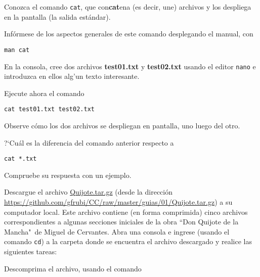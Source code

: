 \documentclass[11pt]{exam}
\begin{document}
\begin{questions}

\item Conozca el comando \texttt{cat}, que con\textbf{cat}ena (es decir, une) archivos y los despliega en la pantalla (la salida estándar).
\begin{parts}
\item  Infórmese de los aspectos generales de este comando desplegando el manual, con 

\begin{verbatim}
man cat
\end{verbatim}



\item En la consola, cree dos archivos \textbf{test01.txt} y \textbf{test02.txt} usando el editor \texttt{nano} e introduzca en ellos alg'un texto interesante.

\item Ejecute ahora el comando 

\begin{verbatim}
cat test01.txt test02.txt
\end{verbatim}

Observe cómo los dos archivos se despliegan en pantalla, uno luego del otro.

\item ?`Cuál es la diferencia del comando anterior respecto a 

\begin{verbatim}
cat *.txt
\end{verbatim}

Compruebe su respuesta con un ejemplo.
\end{parts}

\item Descargue el archivo \href{https://github.com/gfrubi/CC/raw/master/guias/01/Quijote.tar.gz}{Quijote.tar.gz} (desde la dirección \url{https://github.com/gfrubi/CC/raw/master/guias/01/Quijote.tar.gz}) a su computador local. Este archivo contiene (en forma comprimida) cinco archivos correspondientes a algunas secciones iniciales de la obra ``Don Quijote de la Mancha"\, de Miguel de Cervantes. Abra una consola e ingrese (usando el comando \texttt{cd}) a la carpeta donde se encuentra el archivo descargado y realice las siguientes tareas:
\begin{parts}
\item Descomprima el archivo, usando el comando 


\end{parts}
\end{questions}
\end{document}
